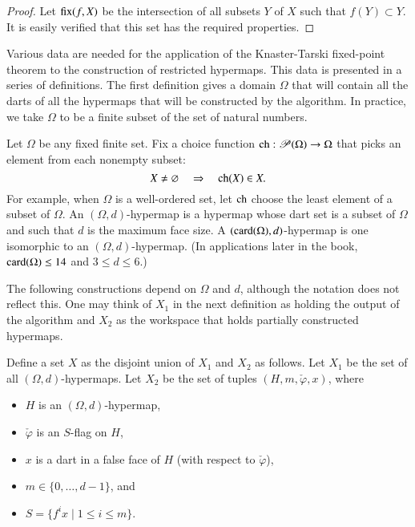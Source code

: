 \begin{proof} Let ${\operatorname{fix}}(f,X)$ be the intersection of all subsets
$Y$ of $X$ such that $f(Y)\subset Y$.  It is easily verified that
this set has the required properties.
\end{proof}

Various data are needed for the application of the Knaster-Tarski
fixed-point theorem to the construction of restricted hypermaps.  This
data is presented in a series of definitions.  The first definition
gives a domain $\Omega$ that will contain all the darts of all the
hypermaps that will be constructed by the algorithm.  In practice, we
take $\Omega$ to be a finite subset of the set of natural numbers.

\begin{definition}[$\Omega$,~$\op{ch}$,~$d$]
  Let $\Omega$ be any fixed finite set.  Fix a choice function
  ${\operatorname{ch}}:{\mathscr P}(\Omega)\to \Omega$ that picks an element from
  each nonempty subset:
\begin{displaymath}
X\ne\varnothing\quad  \Rightarrow \quad  {\operatorname{ch}}(X)\in X.
\end{displaymath}
For example, when
$\Omega$ is a well-ordered set, let $\op{ch}$ choose the least element of a subset
of $\Omega$.  An $(\Omega,d)$-hypermap is a hypermap whose dart set is a
subset of $\Omega$ and such that $d$ is the maximum face size.  A
$({\operatorname{card}}(\Omega),d)$-hypermap is one isomorphic to an $(\Omega,d)$-hypermap.
(In applications later in the book, ${\operatorname{card}}(\Omega)\le14$ and $3\le d\le 6$.) 
\end{definition}
%
%
%


The following constructions depend on $\Omega$ and $d$, although the
notation does not reflect this.  One may think of $X_1$ in the next
definition as holding the output of the algorithm and $X_2$ as the
workspace that holds partially constructed hypermaps.

\begin{definition}[$X$,~$X_1$,~$X_2$]
Define a set $X$ as the disjoint union of $X_1$ and $X_2$ as follows.
Let $X_1$ be the set of all $(\Omega,d)$-hypermaps.
Let $X_2$ be the set of tuples $(H,m,\check\varphi,x)$, where 
\begin{itemize}
\item $H$ is an $(\Omega,d)$-hypermap,
\item $\check\varphi$ is an $S$-flag on $H$,
\item  $x$ is a dart in a false face of $H$ (with respect to $\check\varphi$),
\item $m\in\{0,\ldots,d-1\}$, 
and
\item $S = \{f^i x\mid 1 \le i \le m\}$.
\end{itemize}
\end{definition}


